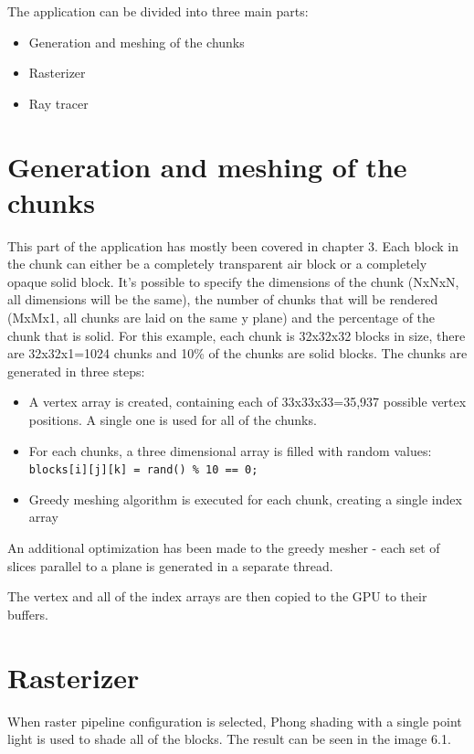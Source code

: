 \documentclass[times, utf8, zavrsni, numeric]{fer}
\begin{document}
The application can be divided into three main parts:
\begin{itemize}
\item{Generation and meshing of the chunks}
\item{Rasterizer}
\item{Ray tracer}
\end{itemize}

\section{Generation and meshing of the chunks}
This part of the application has mostly been covered in chapter 3. Each block in the chunk can either be a completely transparent air block or a completely opaque solid block. It's possible to specify the dimensions of the chunk (NxNxN, all dimensions will be the same), the number of chunks that will be rendered (MxMx1, all chunks are laid on the same y plane) and the percentage of the chunk that is solid. For this example, each chunk is 32x32x32 blocks in size, there are 32x32x1=1024 chunks and 10\% of the chunks are solid blocks. The chunks are generated in three steps:
\begin{itemize}
\item{A vertex array is created, containing each of 33x33x33=35,937 possible vertex positions. A single one is used for all of the chunks.}
\item{For each chunks, a three dimensional array is filled with random values: \texttt{blocks[i][j][k] = rand() \% 10 == 0;}}
\item{Greedy meshing algorithm is executed for each chunk, creating a single index array}
\end{itemize}

An additional optimization has been made to the greedy mesher - each set of slices parallel to a plane is generated in a separate thread.

The vertex and all of the index arrays are then copied to the GPU to their buffers.

\section{Rasterizer}
When raster pipeline configuration is selected, Phong shading with a single point light is used to shade all of the blocks. The result can be seen in the image 6.1.
\end{document}
